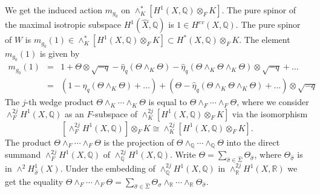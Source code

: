 \documentclass[12pt]{amsart}
\numberwithin{equation}{subsection}
\theoremstyle{plain}
\theoremstyle{definition}
\newcommand{\QQ}{{\mathbb Q}}
\newcommand{\RR}{{\mathbb R}}
\begin{document}
{We get the induced action $m_{g_0}$ on $\wedge^*_K [H^1(X,\QQ)\otimes_F K]$. The pure spinor of the maximal isotropic subspace $H^1(\hat{X},\QQ)$ is $1\in H^{ev}(X,\QQ)$. 
The pure spinor of $W$ is $m_{g_0}(1)\in 
\wedge^*_K[H^1(X,\QQ)\otimes_FK]\subset H^*(X,\QQ)\otimes_F K$. The element $m_{g_0}(1)$
is given by
\begin{eqnarray}
\nonumber
m_{g_0}(1)&=&1+\Theta\otimes\sqrt{-q} -\hat{\eta}_q(\Theta\wedge_{K}\Theta)-\hat{\eta}_q(\Theta\wedge_{K}\Theta\wedge_{K}\Theta)\otimes\sqrt{-q}+\dots
\\
\label{eq-pure-spinor-rho-g-0-of-1}
&=& \left(1-\hat{\eta}_q(\Theta\wedge_{K}\Theta)+\dots\right)+
\left(\Theta-\hat{\eta}_q(\Theta\wedge_{K}\Theta\wedge_{K}\Theta)+\dots\right)\otimes\sqrt{-q}
\end{eqnarray}
The $j$-th wedge product $\Theta\wedge_{K}\cdots\wedge_{K} \Theta$ 
is equal to $\Theta\wedge_F\cdots\wedge_F\Theta$, where we consider $\wedge^{2j}_FH^1(X,\QQ)$
as an $F$-subspace of $\wedge^{2j}_K[H^1(X,\QQ)\otimes_FK]$ via the isomorphism 
\[
[\wedge^{2j}_FH^1(X,\QQ)]\otimes_F K\cong \wedge^{2j}_K[H^1(X,\QQ)\otimes_FK].
\]
The product $\Theta\wedge_F\cdots\wedge_F\Theta$ is the projection of $\Theta\wedge_\QQ\cdots\wedge_\QQ\Theta$ into the 
direct summand $\wedge^{2j}_FH^1(X,\QQ)$ of $\wedge^{2j}_\QQ H^1(X,\QQ)$. Write 
$\Theta=\sum_{\hat{\sigma}\in\hat{\Sigma}}\Theta_{\hat{\sigma}}$, where $\Theta_{\hat{\sigma}}$ is in
$\wedge^2H^1_{\hat{\sigma}}(X)$. Under the embedding of $\wedge^{2j}_\QQ H^1(X,\QQ)$ in $\wedge^{2j}_\RR H^1(X,\RR)$ we get the equality $\Theta\wedge_F\cdots\wedge_F\Theta=\sum_{\hat{\sigma}\in\hat{\Sigma}}\Theta_{\hat{\sigma}}\wedge_\RR\cdots\wedge_\RR\Theta_{\hat{\sigma}}$.

}
\end{document}
